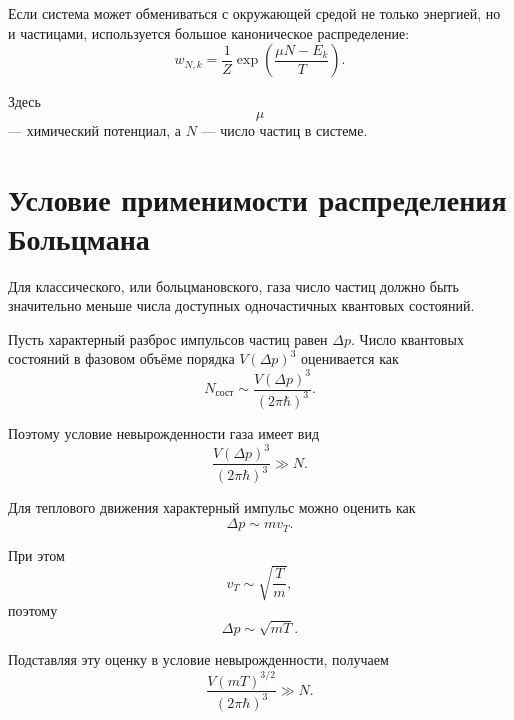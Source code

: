 \documentclass[../final.tex]{subfiles}
\begin{document}
Если система может обмениваться с окружающей средой
не только энергией, но и частицами, используется большое
каноническое распределение:
%
\begin{equation*}
    w_{N,k}
    =
    \frac{1}{Z}
    \exp
    \left(
        \frac{\mu N-E_k}{T}
    \right).
\end{equation*}

Здесь
%
\begin{equation*}
    \mu
\end{equation*}
%
--- химический потенциал, а $N$ --- число частиц в системе.



\section*{Условие применимости распределения Больцмана}

Для классического, или больцмановского, газа число частиц
должно быть значительно меньше числа доступных одночастичных
квантовых состояний.

Пусть характерный разброс импульсов частиц равен $\Delta p$.
Число квантовых состояний в фазовом объёме порядка
$V(\Delta p)^3$ оценивается как
%
\begin{equation*}
    N_{\text{сост}}
    \sim
    \frac{
        V(\Delta p)^3
    }{
        (2\pi\hbar)^3
    }.
\end{equation*}

Поэтому условие невырожденности газа имеет вид
%
\begin{equation*}
    \frac{
        V(\Delta p)^3
    }{
        (2\pi\hbar)^3
    }
    \gg
    N.
\end{equation*}

Для теплового движения характерный импульс можно оценить как
%
\begin{equation*}
    \Delta p
    \sim
    mv_T.
\end{equation*}

При этом
%
\begin{equation*}
    v_T
    \sim
    \sqrt{\frac{T}{m}},
\end{equation*}
%
поэтому
%
\begin{equation*}
    \Delta p
    \sim
    \sqrt{mT}.
\end{equation*}

Подставляя эту оценку в условие невырожденности, получаем
%
\begin{equation*}
    \frac{
        V(mT)^{3/2}
    }{
        (2\pi\hbar)^3
    }
    \gg
    N.
\end{equation*}
\end{document}
